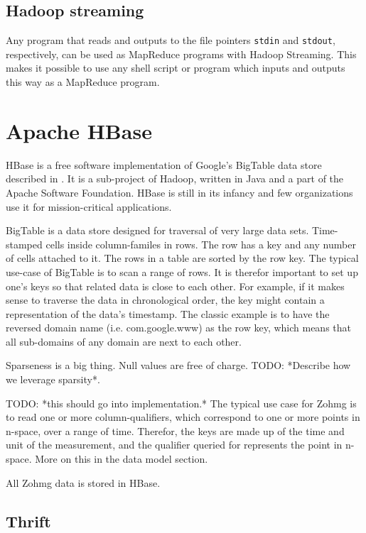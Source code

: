 \documentclass[a4paper,10pt]{book}
\begin{document}
\subsection{Hadoop streaming}

Any program that reads and outputs to the file pointers \texttt{stdin} and
\texttt{stdout}, respectively, can be used as MapReduce programs with
Hadoop Streaming. This makes it possible to use any shell script or
program which inputs and outputs this way as a MapReduce program.


\section{Apache HBase}

HBase is a free software implementation of Google's BigTable data store
described in \cite{bigtable}. It is a sub-project of Hadoop, written in
Java and a part of the Apache Software Foundation. HBase is still in its
infancy and few organizations use it for mission-critical applications.
\cite{hbase}

BigTable is a data store designed for traversal of very large data sets.
Time-stamped cells inside column-familes in rows. The row has a key and
any number of cells attached to it. The rows in a table are sorted by the
row key.  The typical use-case of BigTable is to scan a range of rows. It
is therefor important to set up one's keys so that related data is close
to each other. For example, if it makes sense to traverse the data in
chronological order, the key might contain a representation of the data's
timestamp. The classic example is to have the reversed domain name (i.e.
com.google.www) as the row key, which means that all sub-domains of any
domain are next to each other.

Sparseness is a big thing. Null values are free of charge. TODO: *Describe
how we leverage sparsity*.

TODO: *this should go into implementation.*
The typical use case for Zohmg is to read one or more column-qualifiers,
which correspond to one or more points in n-space, over a range of time.
Therefor, the keys are made up of the time and unit of the measurement,
and the qualifier queried for represents the point in n-space. More on
this in the data model section.

All Zohmg data is stored in HBase.


\subsection{Thrift}
\end{document}

